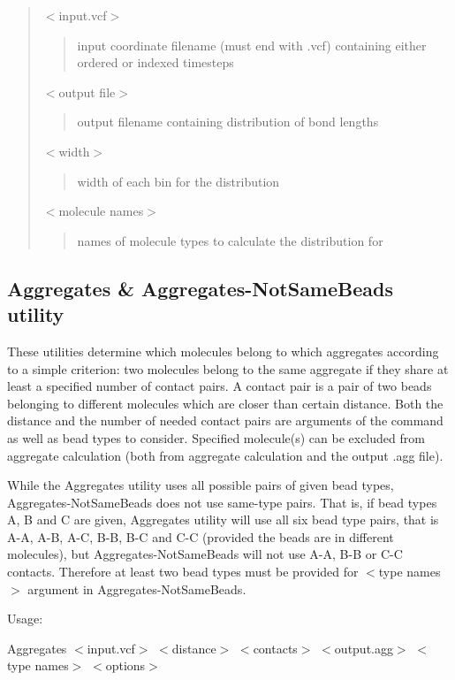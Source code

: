 \begin{quote}
{\ttfamily $<$input.\+vcf$>$} \begin{quote}
input coordinate filename (must end with {\ttfamily .vcf}) containing either ordered or indexed timesteps \end{quote}
{\ttfamily $<$output file$>$} \begin{quote}
output filename containing distribution of bond lengths \end{quote}
{\ttfamily $<$width$>$} \begin{quote}
width of each bin for the distribution \end{quote}
{\ttfamily $<$molecule names$>$} \begin{quote}
names of molecule types to calculate the distribution for \end{quote}
\end{quote}
\hypertarget{Common_Aggregates}{}\subsection{Aggregates \& Aggregates-\/\+Not\+Same\+Beads utility}\label{Common_Aggregates}
These utilities determine which molecules belong to which aggregates according to a simple criterion\+: two molecules belong to the same aggregate if they share at least a specified number of contact pairs. A contact pair is a pair of two beads belonging to different molecules which are closer than certain distance. Both the distance and the number of needed contact pairs are arguments of the command as well as bead types to consider. Specified molecule(s) can be excluded from aggregate calculation (both from aggregate calculation and the output {\ttfamily .agg} file).

While the Aggregates utility uses all possible pairs of given bead types, Aggregates-\/\+Not\+Same\+Beads does not use same-\/type pairs. That is, if bead types {\ttfamily A}, {\ttfamily B} and {\ttfamily C} are given, Aggregates utility will use all six bead type pairs, that is {\ttfamily A-\/A}, {\ttfamily A-\/B}, {\ttfamily A-\/C}, {\ttfamily B-\/B}, {\ttfamily B-\/C} and {\ttfamily C-\/C} (provided the beads are in different molecules), but Aggregates-\/\+Not\+Same\+Beads will not use {\ttfamily A-\/A}, {\ttfamily B-\/B} or {\ttfamily C-\/C} contacts. Therefore at least two bead types must be provided for {\ttfamily $<$type names$>$} argument in Aggregates-\/\+Not\+Same\+Beads.

Usage\+:

{\ttfamily Aggregates $<$input.\+vcf$>$ $<$distance$>$ $<$contacts$>$ $<$output.\+agg$>$ $<$type names$>$ $<$options$>$}

